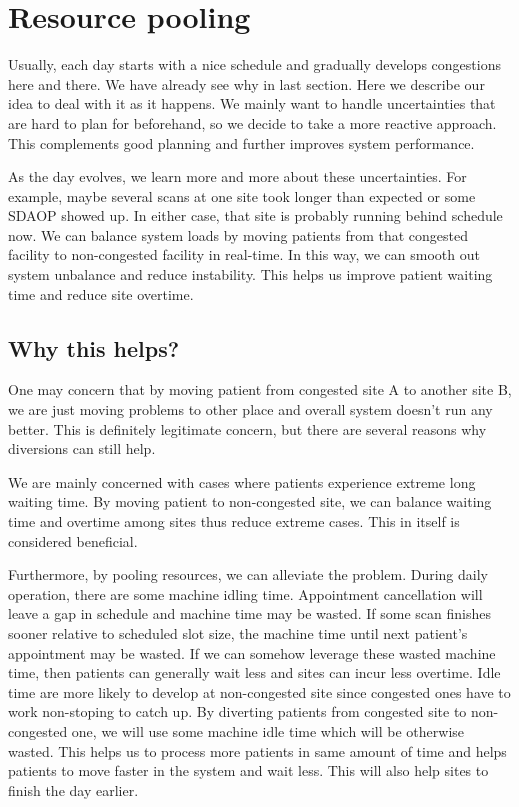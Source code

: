 \section{Resource pooling}

Usually, each day starts with a nice schedule and gradually develops congestions here and there. We have already see why in last section. Here we describe our idea to deal with it as it happens. We mainly want to handle uncertainties that are hard to plan for beforehand, so we decide to take a more reactive approach. This complements good planning and further improves system performance.

As the day evolves, we learn more and more about these uncertainties. For example, maybe several scans at one site took longer than expected or some SDAOP showed up. In either case, that site is probably running behind schedule now. We can balance system loads by moving patients from that congested facility to non-congested facility in real-time. In this way, we can smooth out system unbalance and reduce instability. This helps us improve patient waiting time and reduce site overtime.

\subsection{Why this helps?}

One may concern that by moving patient from congested site A to another site B, we are just moving problems to other place and overall system doesn't run any better. This is definitely legitimate concern, but there are several reasons why diversions can still help.

We are mainly concerned with cases where patients experience extreme long waiting time. By moving patient to non-congested site, we can balance waiting time and overtime among sites thus reduce extreme cases. This in itself is considered beneficial.

Furthermore, by pooling resources, we can alleviate the problem. During daily operation, there are some machine idling time. Appointment cancellation will leave a gap in schedule and machine time may be wasted. If some scan finishes sooner relative to scheduled slot size, the machine time until next patient's appointment may be wasted. If we can somehow leverage these wasted machine time, then patients can generally wait less and sites can incur less overtime. Idle time are more likely to develop at non-congested site since congested ones have to work non-stoping to catch up. By diverting patients from congested site to non-congested one, we will use some machine idle time which will be otherwise wasted. This helps us to process more patients in same amount of time and helps patients to move faster in the system and wait less. This will also help sites to finish the day earlier.

